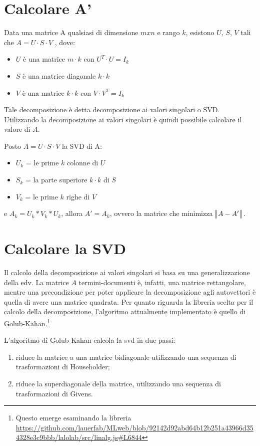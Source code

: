 \section{Calcolare A'}
\begin{theorem}
Data una matrice A qualsiasi di dimensione $m x n$ e rango $k$, esistono $U$, $S$, $V$ tali che $A = U \cdot S \cdot V$ , dove:
\begin{itemize}
    \item $U$ è una matrice $m \cdot k$ con $U^T \cdot U = I_k$
    \item $S$ è una matrice diagonale $k \cdot k$
    \item $V$ è una matrice $k \cdot k$ con $V \cdot V^T = I_k$
\end{itemize}
\end{theorem}
Tale decomposizione è detta decomposizione ai valori singolari o SVD. Utilizzando la decomposizione ai valori singolari è quindi possibile calcolare il valore di $A$.

\noindent Posto $A = U \cdot S \cdot V$ la SVD di A:
\begin{itemize}
    \item $U_k$ = le prime $k$ colonne di $U$
    \item $S_k$ = la parte superiore $k \cdot k$ di $S$
    \item $V_k$ = le prime $k$ righe di $V$
\end{itemize}

e $A_k = U_k *  V_k * U_k$, allora $A' = A_k$, ovvero la matrice che minimizza $\norm{A - A'}$.

\section{Calcolare la SVD}
Il calcolo della decomposizione ai valori singolari si basa su una generalizzazione della \gls{edv}. La matrice $A$ termini-documenti è, infatti, una matrice rettangolare, mentre una precondizione per poter applicare la decomposizione agli autovettori è quella di avere una matrice quadrata.
Per quanto riguarda la libreria scelta per il calcolo della decomposizione, l'algoritmo attualmente implementato è quello di Golub-Kahan.\footnote{Questo emerge esaminando la libreria \url{https://github.com/lauerfab/MLweb/blob/92142d92abd64b12b251a43966d354328e3c9bbb/lalolab/src/linalg.js\#L6844}}

L'algoritmo di Golub-Kahan calcola la \gls{svd} in due passi:
\begin{enumerate}
    \item riduce la matrice a una matrice bidiagonale utilizzando una sequenza di trasformazioni di Householder;
    \item riduce la superdiagonale della matrice, utilizzando una sequenza di trasformazioni di Givens.
\end{enumerate} 


